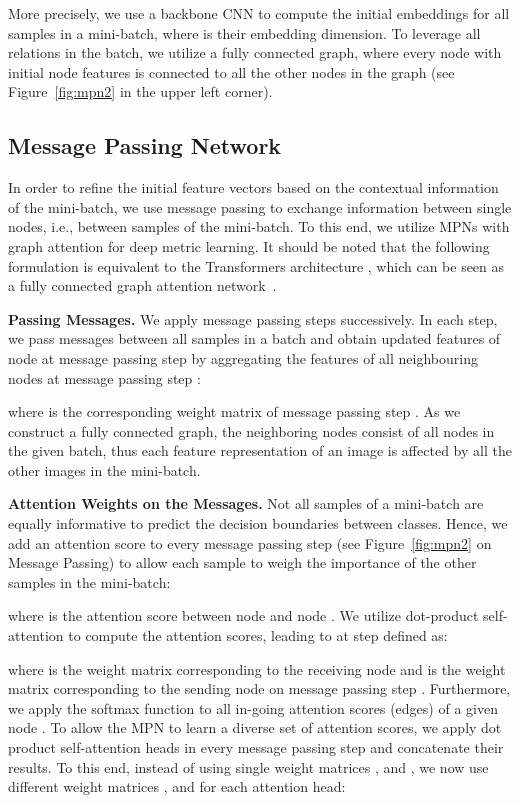 \documentclass{article}
\begin{document}
More precisely, we use a backbone CNN to compute the initial embeddings  for all samples in a mini-batch, where  is their embedding dimension. To leverage all relations in the batch, we utilize a fully connected graph, where every node with initial node features  is connected to all the other nodes in the graph (see Figure~\ref{fig:mpn2} in the upper left corner). 
\vspace{-0.3cm}
\subsection{Message Passing Network}
\label{subsec:MPN}
In order to refine the initial feature vectors based on the contextual information of the mini-batch, we use message passing to exchange information between single nodes, i.e., between samples of the mini-batch. 
To this end, we utilize MPNs with graph attention \cite{DBLP:conf/iclr/VelickovicCCRLB18} for deep metric learning. It should be noted that the following formulation is equivalent to the Transformers architecture \cite{DBLP:conf/nips/VaswaniSPUJGKP17}, which can be seen as a fully connected graph attention network~\cite{DBLP:conf/iclr/VelickovicCCRLB18}.

\noindent\textbf{Passing Messages.} We apply  message passing steps successively. In each step, we pass messages between all samples in a batch and obtain updated features  of node  at message passing step  by aggregating the features  of all neighbouring nodes  at message passing step :


where  is the corresponding weight matrix of message passing step . As we construct a fully connected graph, the neighboring nodes  consist of all nodes in the given batch, thus each feature representation of an image is affected by all the other images in the mini-batch.

\noindent\textbf{Attention Weights on the Messages.} Not all samples of a mini-batch are equally informative to predict the decision boundaries between classes. Hence, we add an attention score  to every message passing step (see Figure~\ref{fig:mpn2} on Message Passing) to allow each sample to weigh the importance of the other samples in the mini-batch:


where  is the attention score between node  and node . 
We utilize dot-product self-attention to compute the attention scores, leading to  at step  defined as:


where  is the weight matrix corresponding to the receiving node and  is the weight matrix corresponding to the sending node on message passing step . Furthermore, we apply the softmax function to all in-going attention scores (edges) of a given node . To allow the MPN to learn a diverse set of attention scores, we apply  dot product self-attention heads in every message passing step and concatenate their results. To this end, instead of using single weight matrices ,  and , we now use different weight matrices ,  and  for each attention head: 
\end{document}
